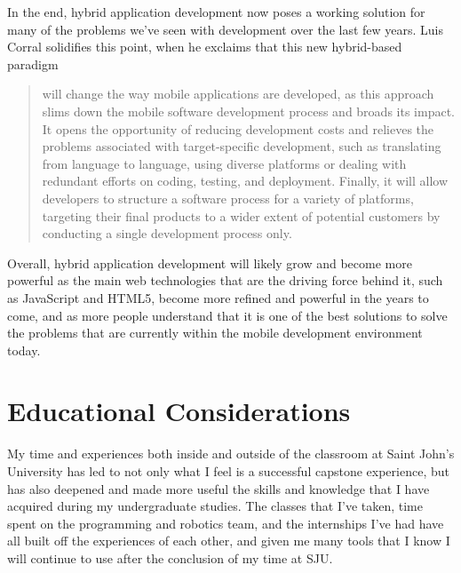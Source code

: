 \documentclass[11pt, twocolumn]{article}
\begin{document}
In the end, hybrid application development now poses a working solution for many of the problems we've seen with development over the last few years.  Luis Corral solidifies this point, when he exclaims that this new hybrid-based paradigm

\begin{quote}
will change the way mobile applications are developed, as this approach slims down the mobile software development process and broads its impact.  It opens the opportunity of reducing development costs and relieves the problems associated with target-specific development, such as translating from language to language, using diverse platforms or dealing with redundant efforts on coding, testing, and deployment.  Finally, it will allow developers to structure a software process for a variety of platforms, targeting their final products to a wider extent of potential customers by conducting a single development process only. ~\cite{Corral2011}
\end{quote}  

Overall, hybrid application development will likely grow and become more powerful as the main web technologies that are the driving force behind it, such as JavaScript and HTML5, become more refined and powerful in the years to come, and as more people understand that it is one of the best solutions to solve the problems that are currently within the mobile development environment today.




\newpage

\section{Educational Considerations}
My time and experiences both inside and outside of the classroom at Saint John's University has led to not only what I feel is a successful capstone experience, but has also deepened and made more useful the skills and knowledge that I have acquired during my undergraduate studies.  The classes that I've taken, time spent on the programming and robotics team, and the internships I've had have all built off the experiences of each other, and given me many tools that I know I will continue to use after the conclusion of my time at SJU.\\
\end{document}
